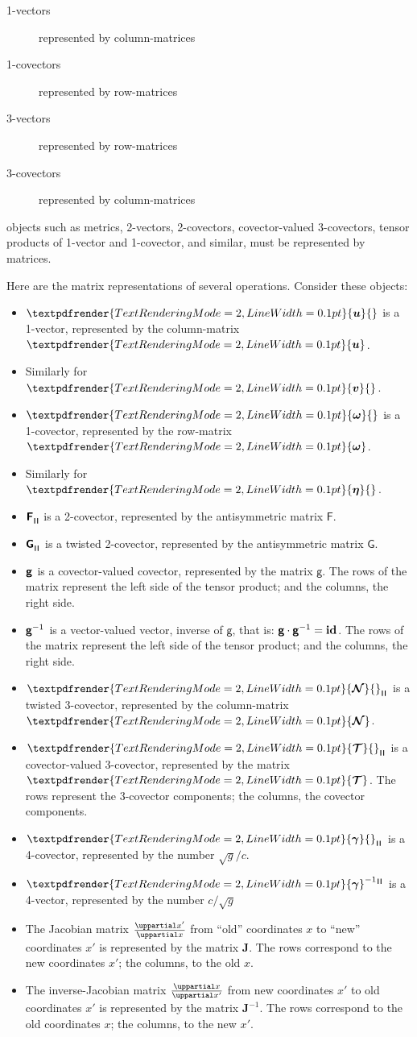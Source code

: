 \documentclass[a4paper,12pt,%
onecolumn,oneside,article,%
british%
]{memoir}
\makeatletter
\theoremstyle{remark}
\theoremstyle{innote}
\newcommand*{\mathte}[1]{\bm{\mathsf{#1}}}
\newcommand*{\xbm}[1]{\textpdfrender{TextRenderingMode=2,LineWidth=0.1pt}{\boldsymbol{#1}}}
\newcommand*{\de}{\mathop{}\!\uppartial}%
\renewcommand*{\|}[1][]{\nonscript\:#1\vert\nonscript\:\mathopen{}}
\newcommand*{\id}{\mathbf{id}}%
\renewcommand*{\i}{{}\indices}
\newcommand*{\q}{}%
\DeclareRobustCommand*{\q}{%
  \mathord{\mathpalette\bigcdot@{}}%
}
\newcommand*{\bigcdot@scalefactor}{0.7}
\newcommand*{\bigcdot@widthfactor}{1.5}
\newcommand*{\bigcdot@}[2]{%
  \sbox0{$#1\vcenter{}$}%
  \sbox2{$#1\cdot\m@th$}%
  \hbox to \bigcdot@widthfactor\wd2{%
    \hfil
    \raise\ht0\hbox{%
      \scalebox{\bigcdot@scalefactor}{%
        \lower\ht0\hbox{$#1\bullet\m@th$}%
      }%
    }%
    \hfil
  }%
}
\newcommand*{\rul}{{\mkern2mu\rule[-0.1ex]{0.75pt}{1.1ex}\mkern2mu}}
\DeclarePairedDelimiter\mul{\rul}{\rul}%
\newcommand*{\yg}{\mathte{g}}
\newcommand*{\dg}{\sqrt{g}}
\newcommand*{\ve}{\xbm{\gamma}}%
\newcommand*{\vi}{\xbm{\gamma}^{-1}}%
\newcommand*{\yN}{\xbm{\mathcal{N}}}
\newcommand*{\yTT}{\xbm{\mathcal{T}}}
\newcommand*{\yu}{\xbm{u}}
\newcommand*{\yv}{\xbm{v}}
\newcommand*{\yo}{\xbm{\omega}}
\newcommand*{\yh}{\xbm{\eta}}
\newcommand*{\yJ}{\bm{J}}
\newcommand*{\yF}{\mathte{F}}
\newcommand*{\yG}{\mathte{G}}
\makeatother
\begin{document}
\begin{description}
\item[1-vectors] represented by column-matrices
\item[1-covectors] represented by row-matrices
\item[3-vectors] represented by row-matrices
\item[3-covectors] represented by column-matrices
\end{description}
objects such as metrics, 2-vectors, 2-covectors, covector-valued 3-covectors, tensor products of 1-vector and 1-covector, and similar, must be represented by matrices.

Here are the matrix representations of several operations. Consider these objects:
\begin{itemize}
\item $\yu\i{^{\q}}$ is a 1-vector, represented by the column-matrix $\yu$.
\item Similarly for $\yv\i{^{\q}}$.
\item $\yo\i{_{\q}}$ is a 1-covector, represented by the row-matrix $\yo$.
\item Similarly for $\yh\i{_{\q}}$.
\item $\yF\i{_{\mul{\q\q}}}$ is a 2-covector, represented by the antisymmetric matrix $\yF$.
\item $\yG\i{_{\mul{\q\q}}}$ is a twisted 2-covector, represented by the antisymmetric matrix $\yG$.
\item $\yg\i{_{\q\q}}$ is a covector-valued covector, represented by the matrix $\yg$. The rows of the matrix represent the left side of the tensor product; and the columns, the right side.
\item ${\yg^{-1}}\i{^{\q\q}}$ is a vector-valued vector, inverse of $\yg$, that is: $\yg\cdot\yg^{-1} = \id\i{_{\q}^{\q}}$. The rows of the matrix represent the left side of the tensor product; and the columns, the right side.

\item $\yN\i{_{\mul{\q\q\q}}}$ is a twisted 3-covector, represented by the column-matrix $\yN$.

\item $\yTT\i{_{\mul{\q\q\q}\q}}$ is a covector-valued 3-covector, represented by the matrix $\yTT$. The rows represent the 3-covector components; the columns, the covector components.
\item $\ve\i{_{\mul{\q\q\q\q}}}$ is a 4-covector, represented by the number $\dg/c$.
\item ${\vi}\i{^{\mul{\q\q\q\q}}}$ is a 4-vector, represented by the number $c/\dg$
\item The Jacobian matrix $\frac{\de x'}{\de x}$ from \enquote{old} coordinates $x$ to \enquote{new} coordinates $x'$ is represented by the matrix $\yJ$. The rows correspond to the new coordinates $x'$; the columns, to the old $x$.

\item The inverse-Jacobian matrix $\frac{\de x}{\de x'}$ from new coordinates $x'$ to old coordinates $x'$ is represented by the matrix $\yJ^{-1}$. The rows correspond to the old coordinates $x$; the columns, to the new $x'$.
\end{itemize}
\end{document}
